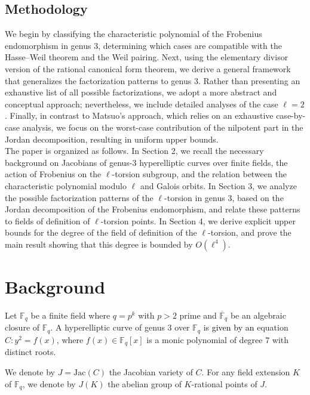 \documentclass[11pt,a4paper]{article}
\theoremstyle{plain}
\theoremstyle{definition}
\theoremstyle{remark}
\newcommand{\verde}[1]{\textcolor{black}{#1}}
\begin{document}
\subsection{Methodology}
 We begin by classifying the characteristic polynomial of the Frobenius endomorphism in genus 3, determining which cases are compatible with the Hasse--Weil theorem and the Weil pairing. Next, using the elementary divisor version of the rational canonical form theorem, we derive a general framework that generalizes the factorization patterns to genus 3. Rather than presenting an exhaustive list of all possible factorizations, we adopt a more abstract and conceptual approach; nevertheless, we include detailed analyses of the case $\ell=2$.
Finally, in contrast to Matsuo's approach, which relies on an exhaustive case-by-case analysis, we focus on the worst-case contribution of the nilpotent part in the Jordan decomposition, resulting in uniform upper bounds.\\
 The paper is organized as follows. In Section 2, we recall the necessary background on Jacobians of genus-3 hyperelliptic curves over finite fields, the action of Frobenius on the $\ell$-torsion subgroup, and the relation between the characteristic polynomial modulo $\ell$ and Galois orbits. In Section 3, we analyze the possible factorization patterns of the $\ell$-torsion in genus 3, based on the Jordan decomposition of the Frobenius endomorphism, and relate these patterns to fields of definition of $\ell$-torsion points.
In Section 4, we derive explicit upper bounds for the degree of the field of definition of the $\ell$-torsion, and prove the main result showing that this degree is bounded by $O(\ell^4)$.



\section{Background}


 Let \( \mathbb{F}_q \) be a finite field where $q=p^k$ with $p>2$ prime and \( \overline{\mathbb{F}}_q \) be an algebraic closure of \( \mathbb{F}_q \).
A hyperelliptic curve of genus \( 3 \) over \( \mathbb{F}_q \) is \verde {given by an} equation \( C :y^2=f(x)\), where $f(x)\in \mathbb{F}_q[x]$ is a monic polynomial of degree $7$ with distinct roots.

We denote by \( J = \mathrm{Jac}(C) \) the Jacobian variety of $C$. For any field extension $K$ of $\mathbb{F}_q$, we denote by $J(K)$ the abelian group of $K$-rational points of $J$. 
\end{document}
